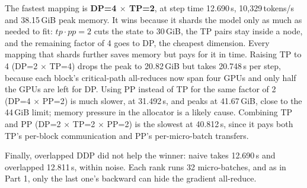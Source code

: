 \documentclass[10pt]{article}
\begin{document}
The fastest mapping is \textbf{DP=4 $\times$ TP=2}, at step time 12.690\,s,
10{,}329\,tokens/s and 38.15\,GiB peak memory.
It wins because it shards the model only as much as needed to fit:
$tp \cdot pp = 2$ cuts the state to 30\,GiB, the TP pairs stay inside a
node, and the remaining factor of 4 goes to DP, the cheapest dimension.
Every mapping that shards further saves memory but pays for it in time.
Raising TP to 4 (DP=2 $\times$ TP=4) drops the peak to 20.82\,GiB but
takes 20.748\,s per step, because each block's critical-path all-reduces
now span four GPUs and only half the GPUs are left for DP.
Using PP instead of TP for the same factor of 2 (DP=4 $\times$ PP=2) is
much slower, at 31.492\,s, and peaks at 41.67\,GiB, close to the
44\,GiB limit; memory pressure in the allocator is a likely cause.
Combining TP and PP (DP=2 $\times$ TP=2 $\times$ PP=2) is the slowest at
40.812\,s, since it pays both TP's per-block communication and PP's
per-micro-batch transfers.

Finally, overlapped DDP did not help the winner: naive takes 12.690\,s and
overlapped 12.811\,s, within noise. Each rank runs 32 micro-batches,
and as in Part 1, only the last one's backward can hide the gradient
all-reduce.
\end{document}
